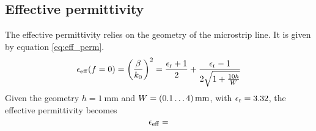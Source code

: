 \subsection{Effective permittivity}
The effective permittivity relies on the geometry of the microstrip line.
It is given by equation \ref{eq:eff_perm}.
\begin{equation}
\epsilon_{\rm eff}(f=0) = \left(\frac{\beta}{k_{\rm 0}} \right)^2 = \frac{\epsilon_{\rm r} + 1}{2} + \frac{\epsilon_{\rm r} - 1}{2 \sqrt{1+\frac{10h}{W}}}
\label{eq:eff_perm}
\end{equation}
Given the geometry $h = \SI{1}{\milli\meter}$ and $W = \mSIrange{0.1}{4}{\milli\meter}$, with $\epsilon_{\rm r} = 3.32$, the effective permittivity becomes
\begin{equation}
\epsilon_{\rm eff} = 
\label{eq:eff_perm_calcd}
\end{equation}